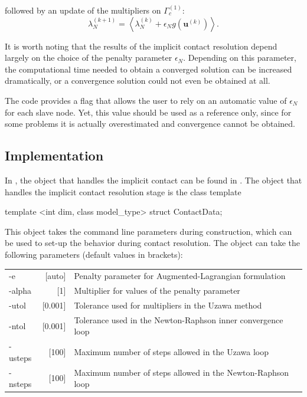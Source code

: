 followed by an update of the multipliers on $\Gamma_c ^ {\left( 1 \right) }$: 
\begin{equation}
\lambda _N ^ {\left( k+1 \right) } = \left< \lambda_N ^ {\left( k \right) } + \epsilon_N g ( \boldsymbol u ^ {\left( k \right) } ) \right>.
\end{equation}


It is worth noting that the results of the implicit contact resolution depend largely on the choice of the penalty parameter $ \epsilon_N $. Depending on this parameter, the computational time needed to obtain a converged solution can be increased dramatically, or a convergence solution could not even be obtained at all.

The code provides a flag that allows the user to rely on an automatic value of $ \epsilon_N $ for each slave node. Yet, this value should be used as a reference only, since for some problems it is actually overestimated and convergence cannot be obtained.


\subsection{Implementation} 

In \akantu, the object that handles the implicit contact can be found in .
The object that handles the implicit contact resolution stage is the class template 
\begin{cpp}
template <int dim, class model_type> struct ContactData;
\end{cpp}
This object takes the command line parameters during construction, which can be used to set-up the behavior during contact resolution. The object can take the following parameters (default values in brackets):

\begin{tabular}{lrl}
  -e & [auto] & Penalty parameter for Augmented-Lagrangian formulation \\
  -alpha & [1] & Multiplier for values of the penalty parameter\\
 -utol & [0.001] & Tolerance used for multipliers in the Uzawa method\\
 -ntol &[0.001]& Tolerance used in the Newton-Raphson inner convergence loop\\
 -usteps &[100]&  Maximum number of steps allowed in the Uzawa loop\\
 -nsteps & [100]&  Maximum number of steps allowed in the Newton-Raphson loop\\
\end{tabular} \\


